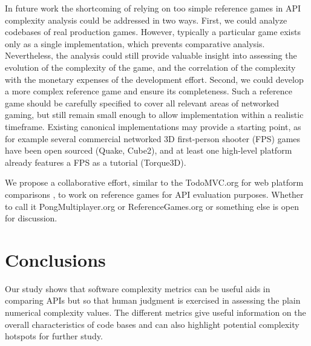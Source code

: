 \documentclass[conference]{IEEEtran}
\begin{document}
In future work the shortcoming of relying on too simple reference
games in API complexity analysis could be addressed in two
ways. First, we could analyze codebases of real production
games. However, typically a particular game exists only as a single
implementation, which prevents comparative analysis. Nevertheless, the
analysis could still provide valuable insight into assessing the
evolution of the complexity of the game, and the correlation of the
complexity with the monetary expenses of the development
effort. Second, we could develop a more complex reference game and
ensure its completeness. Such a reference game should be carefully
specified to cover all relevant areas of networked gaming, but still
remain small enough to allow implementation within a realistic
timeframe. Existing canonical implementations may provide a starting
point, as for example several commercial networked 3D first-person
shooter (FPS) games have been open sourced (Quake, Cube2), and at
least one high-level platform already features a FPS as a tutorial
(Torque3D).

We propose a collaborative effort, similar to the TodoMVC.org for web
platform comparisons \cite{todomvc}, to work on reference games for
API evaluation purposes. Whether to call it PongMultiplayer.org or
ReferenceGames.org or something else is open for discussion.

\section{Conclusions}

Our study shows that software complexity metrics can be useful aids in
comparing APIs but so that human judgment is exercised in assessing
the plain numerical complexity values. The different metrics give
useful information on the overall characteristics of code bases and
can also highlight potential complexity hotspots for further study.


\end{document}
